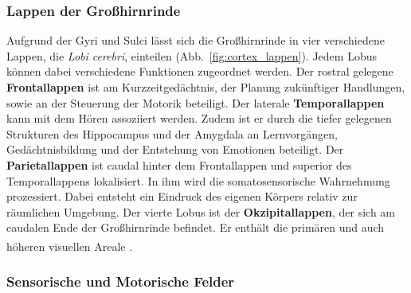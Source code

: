 \documentclass[12pt,a4paper,pdftex]{article}
\begin{document}
\subsubsection*{Lappen der Großhirnrinde}

Aufgrund der Gyri und Sulci lässt sich die Großhirnrinde in vier verschiedene Lappen, die \textit{Lobi cerebri}, einteilen (Abb.~\ref{fig:cortex_lappen}). Jedem Lobus können dabei verschiedene Funktionen zugeordnet werden. Der rostral gelegene \textbf{Frontallappen} ist am Kurzzeitgedächtnis, der Planung zukünftiger Handlungen, sowie an der Steuerung der Motorik beteiligt. Der laterale \textbf{Temporallappen} kann mit dem Hören assoziiert werden. Zudem ist er durch die tiefer gelegenen Strukturen des Hippocampus und der Amygdala an Lernvorgängen, Gedächtnisbildung und der Entstehung von Emotionen beteiligt. Der \textbf{Parietallappen} ist caudal hinter dem Frontallappen und superior des Temporallappens lokalisiert. In ihm wird die somatosensorische Wahrnehmung prozessiert. Dabei entsteht ein Eindruck des eigenen Körpers relativ zur räumlichen Umgebung. Der vierte Lobus ist der \textbf{Okzipitallappen}, der sich am caudalen Ende der Großhirnrinde befindet. Er enthält die primären und auch höheren visuellen Areale \textsuperscript{\cite[1]{kandel2013principles}}.

\subsubsection*{Sensorische und Motorische Felder}
\label{subsubsec:Sens_Mot_Felder}
\end{document}
